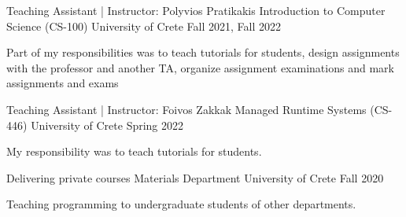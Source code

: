 


\begin{cventries}

  \cventry
    {Teaching Assistant | Instructor: Polyvios Pratikakis} %
    {Introduction to Computer Science (CS-100)} %
    {University of Crete} %
    {Fall 2021, Fall 2022} %
    {
      \begin{cvitems} %
        \item{Part of my responsibilities was to teach tutorials for
            students, design assignments with the professor and
              another TA, organize assignment examinations
	      and mark assignments and exams}
      \end{cvitems}
    }

  \cventry
    {Teaching Assistant | Instructor: Foivos Zakkak} %
    {Managed Runtime Systems (CS-446)} %
    {University of Crete} %
    {Spring 2022} %
    {
      \begin{cvitems} %
        \item{My responsibility was to teach tutorials for
            students.}
      \end{cvitems}
    }


  \cventry
    {Delivering private courses} %
    {Materials Department} %
    {University of Crete} %
    {Fall 2020} %
    {
      \begin{cvitems}
        \item{Teaching programming to undergraduate students of other departments.}
      \end{cvitems}
    }

\end{cventries}
